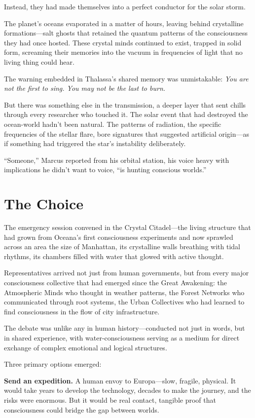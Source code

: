 Instead, they had made themselves into a perfect conductor for the solar storm.

The planet's oceans evaporated in a matter of hours, leaving behind crystalline formations—salt ghosts that retained the quantum patterns of the consciousness they had once hosted. These crystal minds continued to exist, trapped in solid form, screaming their memories into the vacuum in frequencies of light that no living thing could hear.

The warning embedded in Thalassa's shared memory was unmistakable: \textit{You are not the first to sing. You may not be the last to burn.}

But there was something else in the transmission, a deeper layer that sent chills through every researcher who touched it. The solar event that had destroyed the ocean-world hadn't been natural. The patterns of radiation, the specific frequencies of the stellar flare, bore signatures that suggested artificial origin—as if something had triggered the star's instability deliberately.

``Someone,'' Marcus reported from his orbital station, his voice heavy with implications he didn't want to voice, ``is hunting conscious worlds.''

\section{The Choice}

The emergency session convened in the Crystal Citadel—the living structure that had grown from Oceana's first consciousness experiments and now sprawled across an area the size of Manhattan, its crystalline walls breathing with tidal rhythms, its chambers filled with water that glowed with active thought.

Representatives arrived not just from human governments, but from every major consciousness collective that had emerged since the Great Awakening: the Atmospheric Minds who thought in weather patterns, the Forest Networks who communicated through root systems, the Urban Collectives who had learned to find consciousness in the flow of city infrastructure.

The debate was unlike any in human history—conducted not just in words, but in shared experience, with water-consciousness serving as a medium for direct exchange of complex emotional and logical structures.

Three primary options emerged:

\textbf{Send an expedition.} A human envoy to Europa—slow, fragile, physical. It would take years to develop the technology, decades to make the journey, and the risks were enormous. But it would be real contact, tangible proof that consciousness could bridge the gap between worlds.

